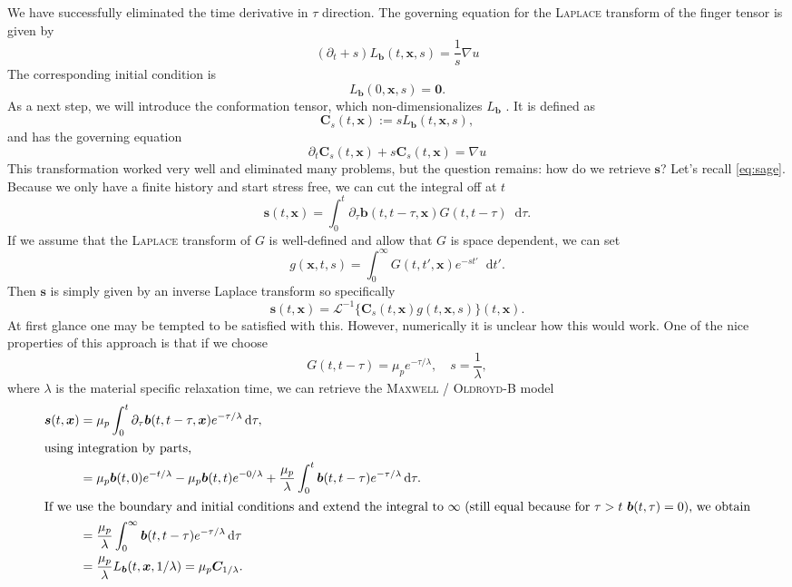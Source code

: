 \documentclass[12pt,a4paper,twoside, open=right]{scrreprt}
\theoremstyle{definition}
\theoremstyle{plain}
\newcommand{\bfb}{\bm{b}}
\newcommand{\bfs}{\bm{s}}
\newcommand{\bfC}{\bm{C}}
\newcommand{\bfx}{\bm{x}}
\newcommand{\D}{\mathop{}\!\mathrm{d}}
\begin{document}
We have successfully eliminated the time derivative in $\tau$ direction. The governing equation for the \textsc{Laplace} transform of the finger tensor is given by
\begin{equation}
(\partial_t +s)L_{\bfb}(t,\bfx,s) = \frac{1}{s}\nabla u
\end{equation}
The corresponding initial condition is 
\begin{equation}
    L_{\bfb}(0,\bfx,s) = \bm{0}.
\end{equation} 
As a next step, we will introduce the conformation tensor, which non-dimensionalizes $L_{\bfb}$ . It is defined as 
\begin{equation}
    \bfC_s(t,\bfx) := sL_{\bfb}(t,\bfx,s),
\end{equation}
and has the governing equation
\begin{equation}
    \partial_t\bfC_s(t,\bfx)+s\bfC_s(t,\bfx) =\nabla u
\end{equation}
This transformation worked very well and eliminated many problems, but the question remains: how do we retrieve $\bfs$?
Let's recall \eqref{eq:sage}.
Because we only have a finite history and start stress free, we can cut the integral off at $t$
\begin{equation}
    \bfs(t,\bfx)=\int_0^t\partial_\tau\bfb(t,t-\tau,\bfx)G(t,t-\tau)\D\tau.\label{eq:sagered}
\end{equation}
If we assume that the \textsc{Laplace} transform of $G$ is well-defined and allow that $G$ is space dependent, we can set
\begin{equation}
    g(\bfx,t,s) =\int_0^\infty G(t,t',\bfx)e^{-st'}\D t'.
\end{equation}
Then $\bfs$ is simply given by an inverse Laplace transform so specifically
\begin{equation}
    \bfs(t,\bfx) =\mathcal{L}^{-1}\{\bfC_s(t,\bfx)g(t,\bfx,s)\}(t,\bfx).
\end{equation}
At first glance one may be tempted to be satisfied with this. However, numerically it is unclear how this would work. One of the nice properties of this approach is that if we choose 
\begin{equation}
    G(t,t-\tau)= \mu_p e^{-\tau/\lambda},\quad s=\frac{1}{\lambda},
\end{equation}
where $\lambda$ is the material specific relaxation time, we can retrieve the \textsc{Maxwell} / \textsc{Oldroyd}-B model 
\begin{align}
    \bfs(t,\bfx)&=\mu_p\int_0^t\partial_\tau\bfb(t,t-\tau,\bfx)e^{-\tau/\lambda}\D\tau,\\
    \intertext{using integration by parts,}
    &=\mu_p\bfb(t,0)e^{-t/\lambda}-\mu_p\bfb(t,t)e^{-0/\lambda}+\frac{\mu_p}{\lambda}\int_0^t\bfb(t,t-\tau)e^{-\tau/\lambda}\D\tau.\\
    \intertext{If we use the boundary and initial conditions and extend the integral to $\infty$ (still equal because for $\tau>t$ $\bfb(t,\tau)=0$), we obtain}
    &=\frac{\mu_p}{\lambda}\int_0^\infty\bfb(t,t-\tau)e^{-\tau/\lambda}\D\tau\\
    &=\frac{\mu_p}{\lambda}L_{\bfb}(t,\bfx,1/\lambda) = \mu_p\bfC_{1/\lambda}.
\end{align}
\end{document}
